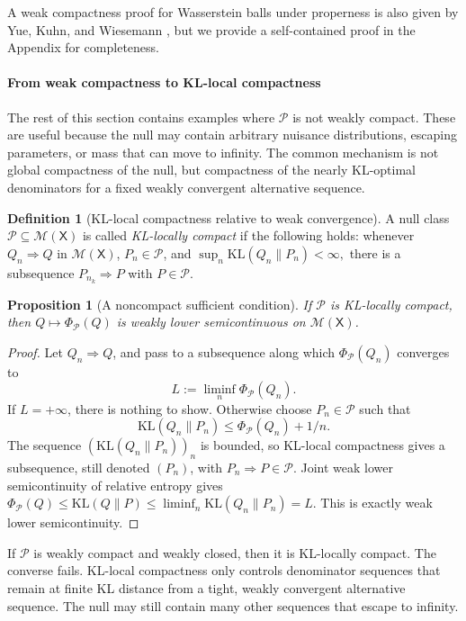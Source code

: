 \documentclass[11pt]{article}
\newcommand{\KL}{\mathrm{KL}}
\newcommand{\Pcal}{\mathcal{P}}
\newcommand{\X}{\mathsf{X}}
\newcommand{\M}{\mathcal{M}}
\newtheorem{proposition}[theorem]{Proposition}
\theoremstyle{definition}
\newtheorem{definition}[theorem]{Definition}
\theoremstyle{definition}
\begin{document}
A weak compactness proof for Wasserstein balls under properness is also given by Yue, Kuhn, and Wiesemann \cite[Theorem 1]{yue2022linear}, but we provide a self-contained proof in the Appendix for completeness.

\paragraph{From weak compactness to KL-local compactness} The rest of this section contains examples where $\Pcal$ is not weakly compact. These are useful because the null may contain arbitrary nuisance distributions, escaping parameters, or mass that can move to infinity.  The common mechanism is not global compactness of the null, but compactness of the nearly KL-optimal denominators for a fixed weakly convergent alternative sequence.

\begin{definition}[KL-local compactness relative to weak convergence]\label{def:kl-local-compact}
A null class \(\Pcal\subseteq\M(\X)\) is called \emph{KL-locally compact} if the following holds: whenever \(Q_n\Rightarrow Q\) in \(\M(\X)\), \(P_n\in\Pcal\), and
\(
  \sup_n \KL(Q_n\|P_n)<\infty,
\)
there is a subsequence \(P_{n_k}\Rightarrow P\) with \(P\in\Pcal\).
\end{definition}

\begin{proposition}[A noncompact sufficient condition]\label{prop:kl-local-compact}
If \(\Pcal\) is KL-locally compact, then \(Q\mapsto\Phi_{\Pcal}(Q)\) is weakly lower semicontinuous on \(\M(\X)\).
\end{proposition}
\begin{proof}
Let \(Q_n\Rightarrow Q\), and pass to a subsequence along which \(\Phi_{\Pcal}(Q_n)\) converges to
\[
  L:=\liminf_n\Phi_{\Pcal}(Q_n).
\]
If \(L=+\infty\), there is nothing to show.  Otherwise choose \(P_n\in\Pcal\) such that
\[
  \KL(Q_n\|P_n)\le \Phi_{\Pcal}(Q_n)+1/n.
\]
The sequence \((\KL(Q_n\|P_n))_n\) is bounded, so KL-local compactness gives a subsequence, still denoted \((P_n)\), with \(P_n\Rightarrow P\in\Pcal\).  Joint weak lower semicontinuity of relative entropy gives
\(
  \Phi_{\Pcal}(Q)
  \le \KL(Q\|P)
  \le \liminf_n \KL(Q_n\|P_n)
  = L.
\)
This is exactly weak lower semicontinuity.
\end{proof}


If \(\Pcal\) is weakly compact and weakly closed, then it is KL-locally compact.  The converse fails.  KL-local compactness only controls denominator sequences that remain at finite KL distance from a tight, weakly convergent alternative sequence.  The null may still contain many other sequences that escape to infinity.
\end{document}
